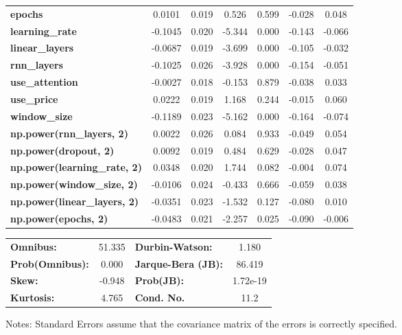 \begin{center}
\begin{tabular}{lcccccc}
\textbf{epochs}                            &       0.0101  &        0.019     &     0.526  &         0.599        &       -0.028    &        0.048     \\
\textbf{learning\_rate}                    &      -0.1045  &        0.020     &    -5.344  &         0.000        &       -0.143    &       -0.066     \\
\textbf{linear\_layers}                    &      -0.0687  &        0.019     &    -3.699  &         0.000        &       -0.105    &       -0.032     \\
\textbf{rnn\_layers}                       &      -0.1025  &        0.026     &    -3.928  &         0.000        &       -0.154    &       -0.051     \\
\textbf{use\_attention}                    &      -0.0027  &        0.018     &    -0.153  &         0.879        &       -0.038    &        0.033     \\
\textbf{use\_price}                        &       0.0222  &        0.019     &     1.168  &         0.244        &       -0.015    &        0.060     \\
\textbf{window\_size}                      &      -0.1189  &        0.023     &    -5.162  &         0.000        &       -0.164    &       -0.074     \\
\textbf{np.power(rnn\_layers, 2)}          &       0.0022  &        0.026     &     0.084  &         0.933        &       -0.049    &        0.054     \\
\textbf{np.power(dropout, 2)}              &       0.0092  &        0.019     &     0.484  &         0.629        &       -0.028    &        0.047     \\
\textbf{np.power(learning\_rate, 2)}       &       0.0348  &        0.020     &     1.744  &         0.082        &       -0.004    &        0.074     \\
\textbf{np.power(window\_size, 2)}         &      -0.0106  &        0.024     &    -0.433  &         0.666        &       -0.059    &        0.038     \\
\textbf{np.power(linear\_layers, 2)}       &      -0.0351  &        0.023     &    -1.532  &         0.127        &       -0.080    &        0.010     \\
\textbf{np.power(epochs, 2)}               &      -0.0483  &        0.021     &    -2.257  &         0.025        &       -0.090    &       -0.006     \\
\bottomrule
\end{tabular}
\begin{tabular}{lclc}
\textbf{Omnibus:}       & 51.335 & \textbf{  Durbin-Watson:     } &    1.180  \\
\textbf{Prob(Omnibus):} &  0.000 & \textbf{  Jarque-Bera (JB):  } &   86.419  \\
\textbf{Skew:}          & -0.948 & \textbf{  Prob(JB):          } & 1.72e-19  \\
\textbf{Kurtosis:}      &  4.765 & \textbf{  Cond. No.          } &     11.2  \\
\bottomrule
\end{tabular}
\end{center}

Notes: \newline
 [1] Standard Errors assume that the covariance matrix of the errors is correctly specified.
